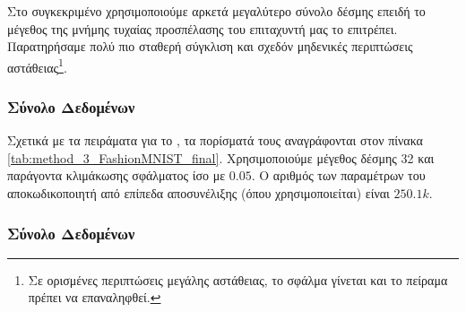 Στο συγκεκριμένο  χρησιμοποιούμε αρκετά μεγαλύτερο σύνολο δέσμης επειδή το μέγεθος της μνήμης τυχαίας προσπέλασης του επιταχυντή μας το επιτρέπει. Παρατηρήσαμε πολύ πιο σταθερή σύγκλιση και σχεδόν μηδενικές περιπτώσεις αστάθειας\footnote{Σε ορισμένες περιπτώσεις μεγάλης αστάθειας, το σφάλμα γίνεται  και το πείραμα πρέπει να επαναληφθεί.}.

\subsubsection{Σύνολο Δεδομένων }

Σχετικά με τα πειράματα για το , τα πορίσματά τους αναγράφονται στον πίνακα \ref{tab:method_3_FashionMNIST_final}. Χρησιμοποιούμε μέγεθος δέσμης 32 και παράγοντα κλιμάκωσης σφάλματος ίσο με $0.05$. Ο αριθμός των παραμέτρων του αποκωδικοποιητή από επίπεδα αποσυνέλιξης (όπου χρησιμοποιείται) είναι $250.1k$.

\begin{table}[h]
    \begin{center}
    \end{center}
    \caption[]{\label{tab:method_3_FashionMNIST_final}Επίδωση των αλγορίθμων της μεθόδου 3 στο σύνολο δεδομένων , όταν χρησιμοποιούνται 30 εποχές για την εκπαίδευση του μοντέλου με μέγεθος δέσμης 32.} 
\end{table}


\subsubsection{Σύνολο Δεδομένων }

